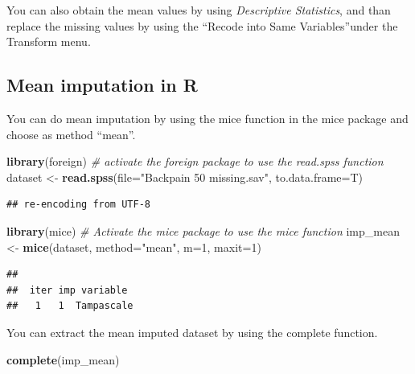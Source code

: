\documentclass[]{book}
\newenvironment{Shaded}{\begin{snugshade}}{\end{snugshade}}
\newcommand{\KeywordTok}[1]{\textcolor[rgb]{0.13,0.29,0.53}{\textbf{#1}}}
\newcommand{\DataTypeTok}[1]{\textcolor[rgb]{0.13,0.29,0.53}{#1}}
\newcommand{\DecValTok}[1]{\textcolor[rgb]{0.00,0.00,0.81}{#1}}
\newcommand{\StringTok}[1]{\textcolor[rgb]{0.31,0.60,0.02}{#1}}
\newcommand{\CommentTok}[1]{\textcolor[rgb]{0.56,0.35,0.01}{\textit{#1}}}
\newcommand{\NormalTok}[1]{#1}
\theoremstyle{definition}
\theoremstyle{definition}
\theoremstyle{definition}
\theoremstyle{remark}
\begin{document}
You can also obtain the mean values by using \emph{Descriptive
Statistics}, and than replace the missing values by using the ``Recode
into Same Variables''under the Transform menu.

\subsection{Mean imputation in R}\label{mean-imputation-in-r}

You can do mean imputation by using the mice function in the mice
package and choose as method ``mean''.

\begin{Shaded}
\begin{Highlighting}[]
\KeywordTok{library}\NormalTok{(foreign) }\CommentTok{# activate the foreign package to use the read.spss function}
\NormalTok{dataset <-}\StringTok{ }\KeywordTok{read.spss}\NormalTok{(}\DataTypeTok{file=}\StringTok{"Backpain 50 missing.sav"}\NormalTok{, }\DataTypeTok{to.data.frame=}\NormalTok{T)}
\end{Highlighting}
\end{Shaded}

\begin{verbatim}
## re-encoding from UTF-8
\end{verbatim}

\begin{Shaded}
\begin{Highlighting}[]
\KeywordTok{library}\NormalTok{(mice) }\CommentTok{# Activate the mice package to use the mice function}
\NormalTok{imp_mean <-}\StringTok{ }\KeywordTok{mice}\NormalTok{(dataset, }\DataTypeTok{method=}\StringTok{"mean"}\NormalTok{, }\DataTypeTok{m=}\DecValTok{1}\NormalTok{, }\DataTypeTok{maxit=}\DecValTok{1}\NormalTok{)}
\end{Highlighting}
\end{Shaded}

\begin{verbatim}
## 
##  iter imp variable
##   1   1  Tampascale
\end{verbatim}

You can extract the mean imputed dataset by using the complete function.

\begin{Shaded}
\begin{Highlighting}[]
\KeywordTok{complete}\NormalTok{(imp_mean)}
\end{Highlighting}
\end{Shaded}
\end{document}
